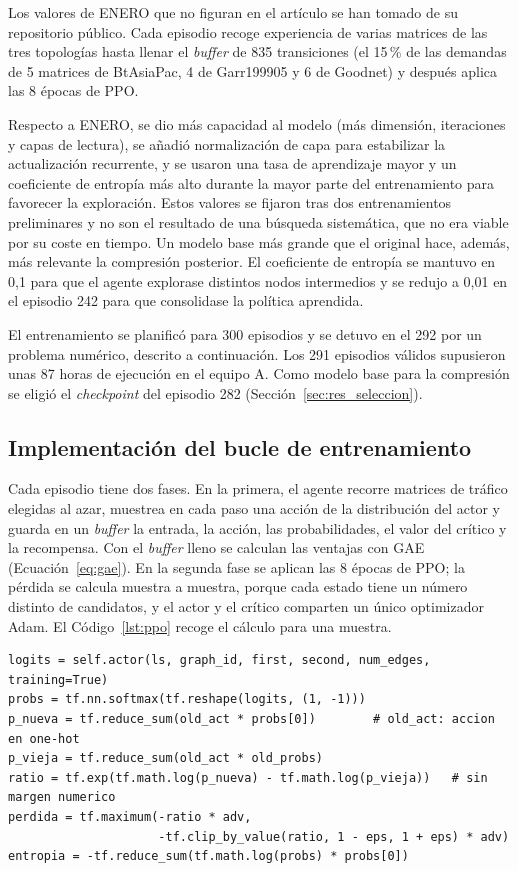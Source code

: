 Los valores de ENERO que no figuran en el artículo se han tomado de su repositorio público. Cada episodio recoge experiencia de varias matrices de las tres topologías hasta llenar el \textit{buffer} de 835 transiciones (el 15\,\% de las demandas de 5 matrices de BtAsiaPac, 4 de Garr199905 y 6 de Goodnet) y después aplica las 8 épocas de PPO.

Respecto a ENERO, se dio más capacidad al modelo (más dimensión, iteraciones y capas de lectura), se añadió normalización de capa para estabilizar la actualización recurrente, y se usaron una tasa de aprendizaje mayor y un coeficiente de entropía más alto durante la mayor parte del entrenamiento para favorecer la exploración. Estos valores se fijaron tras dos entrenamientos preliminares y no son el resultado de una búsqueda sistemática, que no era viable por su coste en tiempo. Un modelo base más grande que el original hace, además, más relevante la compresión posterior. El coeficiente de entropía se mantuvo en 0,1 para que el agente explorase distintos nodos intermedios y se redujo a 0,01 en el episodio 242 para que consolidase la política aprendida.

El entrenamiento se planificó para 300 episodios y se detuvo en el 292 por un problema numérico, descrito a continuación. Los 291 episodios válidos supusieron unas 87 horas de ejecución en el equipo A. Como modelo base para la compresión se eligió el \textit{checkpoint} del episodio 282 (Sección~\ref{sec:res_seleccion}).

\subsection{Implementación del bucle de entrenamiento}\label{sec:codigo_ppo}\label{sec:res_nan}

Cada episodio tiene dos fases. En la primera, el agente recorre matrices de tráfico elegidas al azar, muestrea en cada paso una acción de la distribución del actor y guarda en un \textit{buffer} la entrada, la acción, las probabilidades, el valor del crítico y la recompensa. Con el \textit{buffer} lleno se calculan las ventajas con GAE (Ecuación~\eqref{eq:gae}). En la segunda fase se aplican las 8 épocas de PPO; la pérdida se calcula muestra a muestra, porque cada estado tiene un número distinto de candidatos, y el actor y el crítico comparten un único optimizador Adam. El Código~\ref{lst:ppo} recoge el cálculo para una muestra.

\begin{lstlisting}[style=Python, caption={[Pérdida de PPO para una muestra]Pérdida de PPO para una muestra (\texttt{train\_Enero\_3top\_script\_v2.py}, simplificado).}, label=lst:ppo]
logits = self.actor(ls, graph_id, first, second, num_edges, training=True)
probs = tf.nn.softmax(tf.reshape(logits, (1, -1)))
p_nueva = tf.reduce_sum(old_act * probs[0])        # old_act: accion en one-hot
p_vieja = tf.reduce_sum(old_act * old_probs)
ratio = tf.exp(tf.math.log(p_nueva) - tf.math.log(p_vieja))   # sin margen numerico
perdida = tf.maximum(-ratio * adv,
                     -tf.clip_by_value(ratio, 1 - eps, 1 + eps) * adv)
entropia = -tf.reduce_sum(tf.math.log(probs) * probs[0])
\end{lstlisting}

